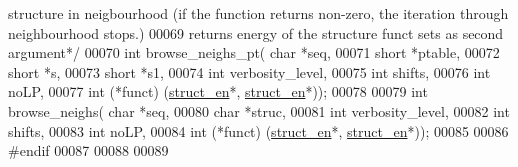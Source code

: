 \begin{DoxyCode}
{       structure in neigbourhood (if the function returns non-zero, the iteration through neighbourhood stops.)}
00069 \textcolor{comment}{    returns energy of the structure funct sets as second argument*/}
00070 \textcolor{keywordtype}{int} browse\_neighs\_pt( \textcolor{keywordtype}{char} *seq,
00071                    \textcolor{keywordtype}{short} *ptable,
00072                    \textcolor{keywordtype}{short} *s,
00073                    \textcolor{keywordtype}{short} *s1,
00074                    \textcolor{keywordtype}{int} verbosity\_level,
00075                    \textcolor{keywordtype}{int} shifts,
00076                    \textcolor{keywordtype}{int} noLP,
00077                    \textcolor{keywordtype}{int} (*funct) (\hyperlink{struct__struct__en}{struct\_en}*, \hyperlink{struct__struct__en}{struct\_en}*));
00078 
00079 \textcolor{keywordtype}{int} browse\_neighs( \textcolor{keywordtype}{char} *seq,
00080                    \textcolor{keywordtype}{char} *struc,
00081                    \textcolor{keywordtype}{int} verbosity\_level,
00082                    \textcolor{keywordtype}{int} shifts,
00083                    \textcolor{keywordtype}{int} noLP,
00084                    \textcolor{keywordtype}{int} (*funct) (\hyperlink{struct__struct__en}{struct\_en}*, \hyperlink{struct__struct__en}{struct\_en}*));
00085 
00086 \textcolor{preprocessor}{#endif}
00087 
00088 
00089 
\end{DoxyCode}
